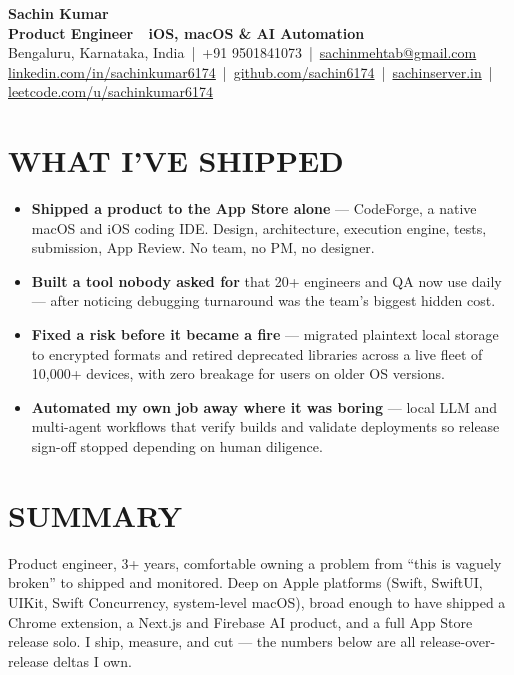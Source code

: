 \documentclass[letterpaper,11pt]{article}
\newcommand{\resumeItem}[1]{\item\small{{#1 \vspace{-2pt}}}}
\newcommand{\resumeItemListStart}{\begin{itemize}}
\newcommand{\resumeItemListEnd}{\end{itemize}\vspace{-5pt}}
\begin{document}
\begin{center}
{\Huge \textbf{Sachin Kumar}} \\ \vspace{4pt}
{\large \textbf{Product Engineer \,\textbar\, iOS, macOS \& AI Automation}} \\ \vspace{5pt}
\small
Bengaluru, Karnataka, India \,|\, +91 9501841073 \,|\,
\href{mailto:sachinmehtab@gmail.com}{sachinmehtab@gmail.com} \\ \vspace{2pt}
\href{https://linkedin.com/in/sachinkumar6174}{linkedin.com/in/sachinkumar6174} \,|\,
\href{https://github.com/sachin6174}{github.com/sachin6174} \,|\,
\href{https://www.sachinserver.in}{sachinserver.in} \,|\,
\href{https://leetcode.com/u/sachinkumar6174/}{leetcode.com/u/sachinkumar6174}
\end{center}

\vspace{-4pt}

\section{WHAT I'VE SHIPPED}
    \vspace{2pt}
    \resumeItemListStart
        \resumeItem{\textbf{Shipped a product to the App Store alone} — CodeForge, a native macOS and iOS coding IDE. Design, architecture, execution engine, tests, submission, App Review. No team, no PM, no designer.}
        \resumeItem{\textbf{Built a tool nobody asked for} that 20+ engineers and QA now use daily — after noticing debugging turnaround was the team's biggest hidden cost.}
        \resumeItem{\textbf{Fixed a risk before it became a fire} — migrated plaintext local storage to encrypted formats and retired deprecated libraries across a live fleet of 10,000+ devices, with zero breakage for users on older OS versions.}
        \resumeItem{\textbf{Automated my own job away where it was boring} — local LLM and multi-agent workflows that verify builds and validate deployments so release sign-off stopped depending on human diligence.}
    \resumeItemListEnd

\vspace{-4pt}

\section{SUMMARY}
\vspace{2pt}
\small Product engineer, 3+ years, comfortable owning a problem from ``this is vaguely broken'' to shipped and monitored. Deep on Apple platforms (Swift, SwiftUI, UIKit, Swift Concurrency, system-level macOS), broad enough to have shipped a Chrome extension, a Next.js and Firebase AI product, and a full App Store release solo. I ship, measure, and cut — the numbers below are all release-over-release deltas I own.
\end{document}
